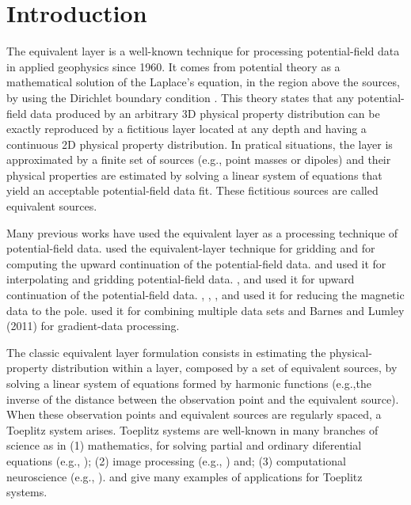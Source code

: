 \documentclass[paper]{geophysics}
\begin{document}
\section{Introduction}

The equivalent layer is a well-known technique for processing potential-field data in applied geophysics since 1960. It comes from potential theory as a mathematical solution of the Laplace's equation, in the region above the sources, by using the Dirichlet boundary condition \cite[]{kellogg1929}.
This theory states that any potential-field data produced by an arbitrary 3D physical property distribution can be exactly reproduced by a fictitious layer located at any depth and having a continuous 2D physical property  distribution. In pratical situations, the layer is approximated by a finite set of sources (e.g., point masses or dipoles) and their physical properties are estimated by solving a linear system of equations that yield an acceptable potential-field data fit. These fictitious sources are called equivalent sources.

Many previous works have used the equivalent layer as a processing technique of potential-field data. \cite{dampney1969equivalent} used the equivalent-layer technique for gridding and for computing the upward continuation of the potential-field data. \cite{cordell1992} and \cite{mendonca-silva1994} used it for interpolating and gridding potential-field data. \cite{emilia1973}, \cite{hansen-miyazaki1984} and \cite{li-oldenburg2010} used it for upward continuation of the potential-field data. \cite{silva1986}, \cite{leao-silva1989}, \cite{guspi-novara2009}, and \cite{oliveirajr-etal2013} used it for reducing the magnetic data to the pole. \cite{boggs-dransfield2004} used it for combining multiple data sets and Barnes and Lumley (2011) for gradient-data processing.

The classic equivalent layer formulation consists in estimating the physical-property distribution within a layer, composed by a set of equivalent sources, by solving a linear system of equations formed by harmonic functions (e.g.,the inverse of the distance between the observation point and the equivalent source). When these observation points and equivalent sources are regularly spaced, a Toeplitz system arises. Toeplitz systems are well-known in many branches of science as in (1) mathematics, for solving partial and ordinary diferential equations (e.g., \cite{lin2003strang}); (2) image processing (e.g., \cite{chan1999cosine}) and; (3) computational neuroscience (e.g., \cite[]{wray1994calculation}). \cite{jin2003developments} and \cite{chan2007introduction} give many examples of applications for Toeplitz systems.
\end{document}
